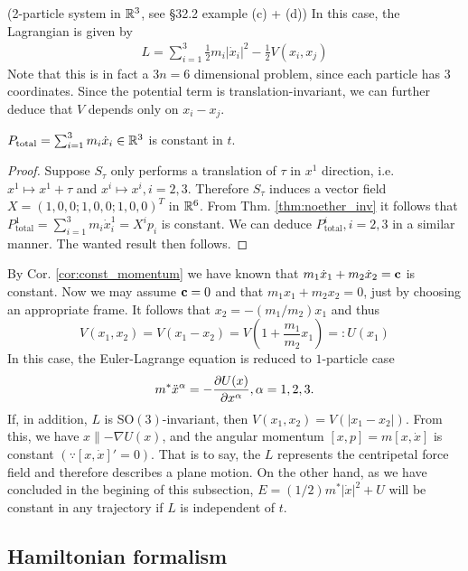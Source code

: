 \begin{example}
	(2-particle system in $\mathbb{R}^3$, see \S 32.2 example (c) + (d)) In this case, the Lagrangian is given by
	\begin{eqnarray}
		L = \sum_{i = 1}^{3} \frac{1}{2}m_i|\dot{x}_i|^2 - \frac{1}{2} V(x_i, x_j)
		\nonumber
	\end{eqnarray}
	Note that this is in fact a $3n = 6$ dimensional problem, since each particle has $3$ coordinates. Since the potential term is translation-invariant, we can further deduce that $V$ depends only on $x_i - x_j$.
	
	\begin{corollary}
		$P_{\text{total}} = \sum_{i = 1}^{3} m_i \dot{x}_i \in \mathbb{R}^3$ is constant in $t$.
		\label{cor:const_momentum}
	\end{corollary}
	\begin{proof}
		Suppose $S_{\tau}$ only performs a translation of $\tau$ in $x^1$ direction, i.e. $x^1 \mapsto x^1 + \tau$ and $ x^i \mapsto x^i, i = 2, 3$. Therefore $S_{\tau}$ induces a vector field $X = (1, 0, 0; 1, 0, 0; 1, 0, 0)^{T}$ in $\mathbb{R}^6$. From Thm. \ref{thm:noether_inv} it follows that $P^1_{\text{total}} = \sum_{i = 1}^{3} m_i \dot{x}^1_i = X^ip_{i}$ is constant. We can deduce $P^i_{\text{total}}, i = 2, 3$ in a similar manner. The wanted result then follows.
	\end{proof}

	By Cor. \ref{cor:const_momentum} we have known that $m_1\dot{x}_1 + m_2\dot{x}_2 = \mathbf{c}$ is constant. Now we may assume $\mathbf{c} = 0$ and that $m_1 x_1 + m_2 x_2 = 0$, just by choosing an appropriate frame. It follows that $x_2 = -(m_1/m_2)x_1$ and thus
	\[ V(x_1, x_2) = V(x_1 - x_2) = V(1+\frac{m_1}{m_2}x_1) =: U(x_1) \]
	In this case, the Euler-Lagrange equation is reduced to $1$-particle case
	\[m^* \ddot{x}^{\alpha} = - \frac{ \partial U(x)}{ \partial x^{\alpha} }, \alpha = 1, 2, 3.\]
	If, in addition, $L$ is SO$(3)$-invariant, then $V(x_1, x_2) = V(|x_1 - x_2|)$. From this, we have  $x \parallel -\nabla U(x)$, and the angular momentum $[x, p] = m[x, \dot{x}]$ is constant $(\because [x, \dot{x}]' = 0)$. That is to say, the $L$ represents the centripetal force field and therefore describes a plane motion. On the other hand, as we have concluded in the begining of this subsection, $E = (1/2)m^* |\dot{x}|^2 + U$ will be constant in any trajectory if $L$ is independent of $t$. 
\end{example}

\subsection{Hamiltonian formalism}

